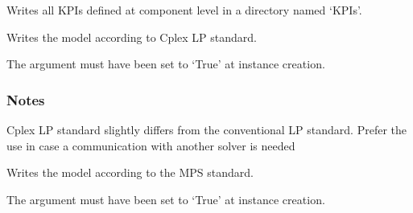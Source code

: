 \documentclass[letterpaper,10pt,english]{sphinxmanual}
\begin{document}
\begin{fulllineitems}
\begin{fulllineitems}
\end{fulllineitems}


\begin{fulllineitems}
\label{\detokenize{generated/tamos.data_IO.ResultsExport:tamos.data_IO.ResultsExport.write_KPIs}}
\pysigstartsignatures
{}
\pysigstopsignatures
\sphinxAtStartPar
Writes all KPIs defined at component level in a directory named ‘KPIs’.

\end{fulllineitems}


\begin{fulllineitems}
\label{\detokenize{generated/tamos.data_IO.ResultsExport:tamos.data_IO.ResultsExport.write_LP}}
\pysigstartsignatures
{}
\pysigstopsignatures
\sphinxAtStartPar
Writes the model according to Cplex LP standard.

\sphinxAtStartPar
The  argument must have been set to ‘True’ at instance creation.
\subsubsection*{Notes}

\sphinxAtStartPar
Cplex LP standard slightly differs from the conventional LP standard.
Prefer the use  in case a communication with another solver is needed

\end{fulllineitems}


\begin{fulllineitems}
\label{\detokenize{generated/tamos.data_IO.ResultsExport:tamos.data_IO.ResultsExport.write_MPS}}
\pysigstartsignatures
{}
\pysigstopsignatures
\sphinxAtStartPar
Writes the model according to the MPS standard.

\sphinxAtStartPar
The  argument must have been set to ‘True’ at instance creation.


\end{fulllineitems}
\end{fulllineitems}
\end{document}

